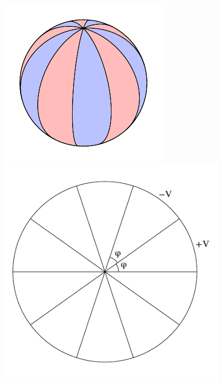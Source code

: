   \begin{figure} 
    \centering
    \includegraphics[width=\linewidth]{fig/Jackson3-4_1.pdf}\\
    \includegraphics[width=\linewidth]{fig/Jackson3-4_2.pdf}
  \end{figure}%
